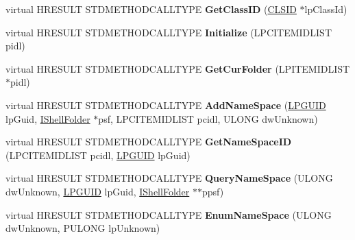 \begin{DoxyCompactItemize}
virtual H\+R\+E\+S\+U\+LT S\+T\+D\+M\+E\+T\+H\+O\+D\+C\+A\+L\+L\+T\+Y\+PE {\bfseries Get\+Class\+ID} (\hyperlink{struct___i_i_d}{C\+L\+S\+ID} $\ast$lp\+Class\+Id)
\item 
\mbox{\label{class_c_merged_folder_aa1e610602cb8da15005d6b0f03a20b71}} 
virtual H\+R\+E\+S\+U\+LT S\+T\+D\+M\+E\+T\+H\+O\+D\+C\+A\+L\+L\+T\+Y\+PE {\bfseries Initialize} (L\+P\+C\+I\+T\+E\+M\+I\+D\+L\+I\+ST pidl)
\item 
\mbox{\label{class_c_merged_folder_afcaf72904b53abc94daa670e53bd7c62}} 
virtual H\+R\+E\+S\+U\+LT S\+T\+D\+M\+E\+T\+H\+O\+D\+C\+A\+L\+L\+T\+Y\+PE {\bfseries Get\+Cur\+Folder} (L\+P\+I\+T\+E\+M\+I\+D\+L\+I\+ST $\ast$pidl)
\item 
\mbox{\label{class_c_merged_folder_aa4e8fabc14e06248b5381a43314f197e}} 
virtual H\+R\+E\+S\+U\+LT S\+T\+D\+M\+E\+T\+H\+O\+D\+C\+A\+L\+L\+T\+Y\+PE {\bfseries Add\+Name\+Space} (\hyperlink{interface_g_u_i_d}{L\+P\+G\+U\+ID} lp\+Guid, \hyperlink{interface_i_shell_folder}{I\+Shell\+Folder} $\ast$psf, L\+P\+C\+I\+T\+E\+M\+I\+D\+L\+I\+ST pcidl, U\+L\+O\+NG dw\+Unknown)
\item 
\mbox{\label{class_c_merged_folder_abfb10010f88cd6993efb1319f582fdf5}} 
virtual H\+R\+E\+S\+U\+LT S\+T\+D\+M\+E\+T\+H\+O\+D\+C\+A\+L\+L\+T\+Y\+PE {\bfseries Get\+Name\+Space\+ID} (L\+P\+C\+I\+T\+E\+M\+I\+D\+L\+I\+ST pcidl, \hyperlink{interface_g_u_i_d}{L\+P\+G\+U\+ID} lp\+Guid)
\item 
\mbox{\label{class_c_merged_folder_a04da110907a29d4a1ec45f46da8578cc}} 
virtual H\+R\+E\+S\+U\+LT S\+T\+D\+M\+E\+T\+H\+O\+D\+C\+A\+L\+L\+T\+Y\+PE {\bfseries Query\+Name\+Space} (U\+L\+O\+NG dw\+Unknown, \hyperlink{interface_g_u_i_d}{L\+P\+G\+U\+ID} lp\+Guid, \hyperlink{interface_i_shell_folder}{I\+Shell\+Folder} $\ast$$\ast$ppsf)
\item 
\mbox{\label{class_c_merged_folder_a63685183c13cb421994116ef7893f6dd}} 
virtual H\+R\+E\+S\+U\+LT S\+T\+D\+M\+E\+T\+H\+O\+D\+C\+A\+L\+L\+T\+Y\+PE {\bfseries Enum\+Name\+Space} (U\+L\+O\+NG dw\+Unknown, P\+U\+L\+O\+NG lp\+Unknown)
\item 
\mbox{\label{class_c_merged_folder_a43322ed13c3f67d91ec0ed5bf3aebbd2}} 
$$
\end{DoxyCompactItemize}
